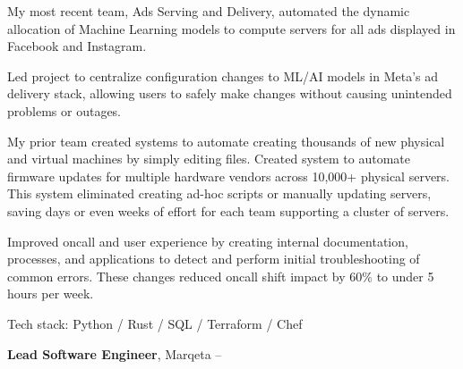 \documentclass[MMMMyyyy,nonstopmode]{simpleresumecv_stacked}
\newcommand{\tech}[1]{\Gap Tech stack: #1}
\newcommand{\techsep}{/ }
\begin{document}
\begin{Body}
\begin{Detail}
\Gap

My most recent team, Ads Serving and Delivery, automated the dynamic allocation of Machine Learning models to compute servers for all ads displayed in Facebook and Instagram.

\BulletItem
Led project to centralize configuration changes to ML/AI models in Meta's ad delivery stack, allowing users to safely make changes without causing unintended problems or outages.

\Gap
My prior team created systems to automate creating thousands of new physical and virtual machines by simply editing files. 
\BulletItem
Created system to automate firmware updates for multiple hardware vendors across 10,000+ physical servers. 
This system eliminated creating ad-hoc scripts or manually updating servers, saving days or even weeks of effort for each team supporting a cluster of servers.

\BulletItem
Improved oncall and user experience by creating internal documentation, processes, and applications to detect and perform initial troubleshooting of common errors.
These changes reduced oncall shift impact by 60\% to under 5 hours per week.


\fi 		%

\tech{Python \techsep Rust \techsep SQL \techsep Terraform \techsep Chef}

\end{Detail}

\BigGap

\Entry
\textbf{Lead Software Engineer}, Marqeta
\hfill
 -- 


\end{Body}
\end{document}
